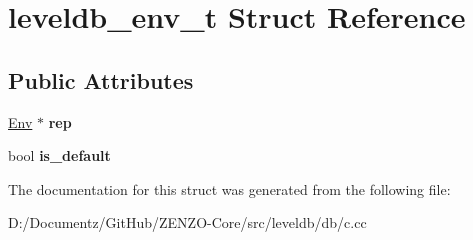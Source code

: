 \hypertarget{structleveldb__env__t}{}\section{leveldb\+\_\+env\+\_\+t Struct Reference}
\label{structleveldb__env__t}
\subsection*{Public Attributes}
\begin{DoxyCompactItemize}
\item 
\mbox{\label{structleveldb__env__t_ad41038b41aebaf7ffba1a4bbfaa8b539}} 
\mbox{\hyperlink{classleveldb_1_1_env}{Env}} $\ast$ {\bfseries rep}
\item 
\mbox{\label{structleveldb__env__t_a53e285385a628e932128aec1f0fe1dae}} 
bool {\bfseries is\+\_\+default}
\end{DoxyCompactItemize}


The documentation for this struct was generated from the following file\+:\begin{DoxyCompactItemize}
\item 
D\+:/\+Documentz/\+Git\+Hub/\+Z\+E\+N\+Z\+O-\/\+Core/src/leveldb/db/c.\+cc\end{DoxyCompactItemize}
